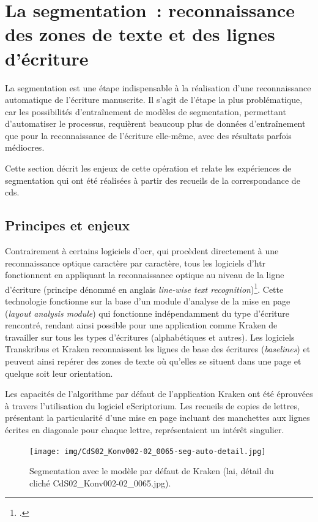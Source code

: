 \documentclass[a4paper,12pt,twoside]{book}
\begin{document}
		\section[La \gls{segmentation}]{La \gls{segmentation}~: reconnaissance des zones de texte et des lignes d'écriture}
			\label{lieu-segmentation}
			
			La \gls{segmentation} est une étape indispensable à la réalisation d'une reconnaissance automatique de l'écriture manuscrite. Il s'agit de l'étape la plus problématique, car les possibilités d'entraînement de modèles de \gls{segmentation}, permettant d'automatiser le processus, requièrent beaucoup plus de données d'entraînement que pour la reconnaissance de l'écriture elle-même, avec des résultats parfois médiocres.
			
			Cette section décrit les enjeux de cette opération et relate les expériences de \gls{segmentation} qui ont été réalisées à partir des recueils de la correspondance de \gls{cds}.
						
			\subsection{Principes et enjeux}
				Contrairement à certains logiciels d'\gls{ocr}, qui procèdent directement à une reconnaissance optique caractère par caractère, tous les logiciels d'\gls{htr} fonctionnent en appliquant la reconnaissance optique au niveau de la ligne d'écriture (principe dénommé en anglais \textit{line-wise text recognition})\footcite{stokesEScriptoriumVREManuscript2021}. Cette technologie fonctionne sur la base d'un module d'analyse de la mise en page (\textit{layout analysis module}) qui fonctionne indépendamment du type d'écriture rencontré, rendant ainsi possible pour une application comme Kraken de travailler sur tous les types d'écritures (alphabétiques et autres). Les logiciels Transkribus et Kraken reconnaissent les lignes de base des écritures (\textit{baselines}) et peuvent ainsi repérer des zones de texte où qu'elles se situent dans une page et quelque soit leur orientation. 
				
				Les capacités de l'algorithme par défaut de l'application Kraken ont été éprouvées à travers l'utilisation du logiciel eScriptorium. Les recueils de copies de lettres, présentant la particularité d'une mise en page incluant des manchettes aux lignes écrites en diagonale pour chaque lettre, représentaient un intérêt singulier.
				
				\begin{figure}[!h]
					\centering
					\texttt{[image: img/CdS02\_Konv002-02\_0065-seg-auto-detail.jpg]}
					\caption{Segmentation avec le modèle par défaut de Kraken (\gls{lai}, détail du cliché CdS02\_Konv002-02\_0065.jpg).}
					\label{seg-defaut-65}
				\end{figure}
			
\end{document}
